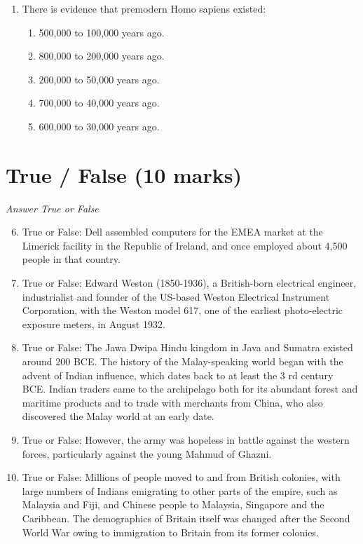 \documentclass[12pt]{article}
\begin{document}
\begin{enumerate}[label=\arabic*.]
\begin{enumerate}[label=(\alph*)]
    \item Aurignacian technology was primarily used for creating stone tools.
    \item Aurignacian technology was less advanced than Mousterian technology.
    \item Mousterian technology produced more usable blade surface.
    \item Aurignacian technology produced more usable blade surface.
\end{enumerate}
\item There is evidence that premodern Homo sapiens existed:
\begin{enumerate}[label=(\alph*)]
    \item 500,000 to 100,000 years ago.
    \item 800,000 to 200,000 years ago.
    \item 200,000 to 50,000 years ago.
    \item 700,000 to 40,000 years ago.
    \item 600,000 to 30,000 years ago.
\end{enumerate}
\end{enumerate}

\section*{True / False (10 marks)}
\textit{Answer True or False}
\begin{enumerate}[label=\arabic*.]
\setcounter{enumi}{5}
\item True or False: Dell assembled computers for the EMEA market at the Limerick facility in the Republic of Ireland, and once employed about 4,500 people in that country.
\item True or False: Edward Weston (1850-1936), a British-born electrical engineer, industrialist and founder of the US-based Weston Electrical Instrument Corporation, with the Weston model 617, one of the earliest photo-electric exposure meters, in August 1932.
\item True or False: The Jawa Dwipa Hindu kingdom in Java and Sumatra existed around 200 BCE. The history of the Malay-speaking world began with the advent of Indian influence, which dates back to at least the 3 rd century BCE. Indian traders came to the archipelago both for its abundant forest and maritime products and to trade with merchants from China, who also discovered the Malay world at an early date.
\item True or False: However, the army was hopeless in battle against the western forces, particularly against the young Mahmud of Ghazni.
\item True or False: Millions of people moved to and from British colonies, with large numbers of Indians emigrating to other parts of the empire, such as Malaysia and Fiji, and Chinese people to Malaysia, Singapore and the Caribbean. The demographics of Britain itself was changed after the Second World War owing to immigration to Britain from its former colonies.
\end{enumerate}
\end{document}
